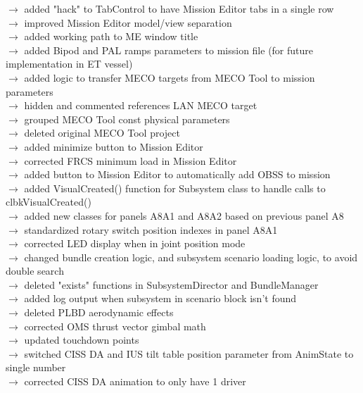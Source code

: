 \documentclass[Space_Shuttle_Vessel_Manual.tex]{subfiles}
\begin{document}
$\rightarrow$ added "hack" to TabControl to have Mission Editor tabs in a single row\\
$\rightarrow$ improved Mission Editor model/view separation\\
$\rightarrow$ added working path to ME window title\\
$\rightarrow$ added Bipod and PAL ramps parameters to mission file (for future implementation in ET vessel)\\
$\rightarrow$ added logic to transfer MECO targets from MECO Tool to mission parameters\\
$\rightarrow$ hidden and commented references LAN MECO target\\
$\rightarrow$ grouped MECO Tool const physical parameters\\
$\rightarrow$ deleted original MECO Tool project\\
$\rightarrow$ added minimize button to Mission Editor\\
$\rightarrow$ corrected FRCS minimum load in Mission Editor\\
$\rightarrow$ added button to Mission Editor to automatically add OBSS to mission\\
$\rightarrow$ added VisualCreated() function for Subsystem class to handle calls to clbkVisualCreated()\\
$\rightarrow$ added new classes for panels A8A1 and A8A2 based on previous panel A8\\
$\rightarrow$ standardized rotary switch position indexes in panel A8A1\\
$\rightarrow$ corrected LED display when in joint position mode\\
$\rightarrow$ changed bundle creation logic, and subsystem scenario loading logic, to avoid double search\\
$\rightarrow$ deleted "exists" functions in SubsystemDirector and BundleManager\\
$\rightarrow$ added log output when subsystem in scenario block isn't found\\
$\rightarrow$ deleted PLBD aerodynamic effects\\
$\rightarrow$ corrected OMS thrust vector gimbal math\\
$\rightarrow$ updated touchdown points\\
$\rightarrow$ switched CISS DA and IUS tilt table position parameter from AnimState to single number\\
$\rightarrow$ corrected CISS DA animation to only have 1 driver\\
\end{document}
